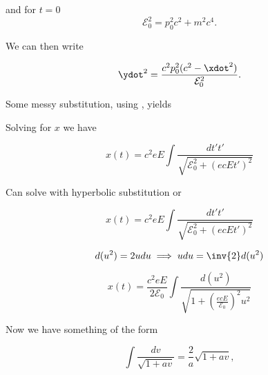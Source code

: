 {and for \(t=0\)
\begin{equation}\label{eqn:relativisticElectrodynamicsT3:100b}
\mathcal{E}_0^2 = p_0^2 c^2 + m^2 c^4.
\end{equation}

We can then write

\begin{equation}\label{eqn:relativisticElectrodynamicsT3:120}
\ydot^2 = \frac{ c^2 p_0^2 (c^2 - \xdot^2)}{ \mathcal{E}_0^2 }.
\end{equation}

Some messy substitution, using , yields



Solving for \(x\) we have

\begin{equation}\label{eqn:relativisticElectrodynamicsT3:220}
x(t) = c^2 e E \int \frac{dt' t'}{\sqrt{ \mathcal{E}_0^2 + (e c E t')^2 }}
\end{equation}

Can solve with hyperbolic substitution or

\begin{equation}\label{eqn:relativisticElectrodynamicsT3:240}
x(t) = c^2 e E \int \frac{dt' t'}{\sqrt{ \mathcal{E}_0^2 + (e c E t')^2 }}
\end{equation}

\begin{equation}\label{eqn:relativisticElectrodynamicsT3:260}
d(u^2) = 2 u du \implies u du = \inv{2} d(u^2)
\end{equation}

\begin{equation}\label{eqn:relativisticElectrodynamicsT3:280}
x(t) = \frac{c^2 e E}{2 \mathcal{E}_0} \int \frac{d (u^2)}{\sqrt{ 1 + \left(\frac{e c E}{\mathcal{E}_0}\right)^2 u^2 }}
\end{equation}

Now we have something of the form

\begin{equation}\label{eqn:relativisticElectrodynamicsT3:290}
\int \frac{d v}{\sqrt{1 + a v}} = \frac{2}{a} \sqrt{1 + a v},
\end{equation}

}
